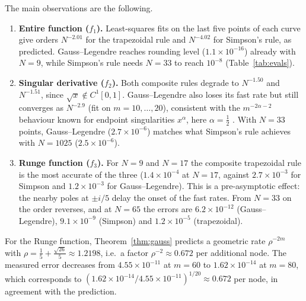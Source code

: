 \documentclass[10pt,twocolumn,a4paper]{article}
\theoremstyle{plain}
\theoremstyle{remark}
\begin{document}
\begin{table}[t]
  \centering
  \small
  \setlength{\tabcolsep}{4pt}
  \caption{Smallest number of evaluations $N$ giving an absolute error below $10^{-8}$ (searched on the grids of Section~\ref{sec:setup}; ``$>$'' means not reached).}
  \label{tab:evals}
  
\end{table}

The main observations are the following.
\begin{enumerate}
  \item \textbf{Entire function ($f_1$).} Least-squares fits on the last five points of each curve give orders $N^{-2.01}$ for the trapezoidal rule and $N^{-4.02}$ for Simpson's rule, as predicted. Gauss--Legendre reaches rounding level ($1.1\times10^{-16}$) already with $N=9$, while Simpson's rule needs $N=33$ to reach $10^{-8}$ (Table~\ref{tab:evals}).
  \item \textbf{Singular derivative ($f_2$).} Both composite rules degrade to $N^{-1.50}$ and $N^{-1.51}$, since $\sqrt{x}\notin C^1[0,1]$. Gauss--Legendre also loses its fast rate but still converges as $N^{-2.9}$ (fit on $m=10,\dots,20$), consistent with the $m^{-2\alpha-2}$ behaviour known for endpoint singularities $x^{\alpha}$, here $\alpha=\tfrac12$ \citep{davis1984}. With $N=33$ points, Gauss--Legendre ($2.7\times10^{-6}$) matches what Simpson's rule achieves with $N=1025$ ($2.5\times10^{-6}$).
  \item \textbf{Runge function ($f_3$).} For $N=9$ and $N=17$ the composite trapezoidal rule is the most accurate of the three ($1.4\times10^{-4}$ at $N=17$, against $2.7\times10^{-3}$ for Simpson and $1.2\times10^{-3}$ for Gauss--Legendre). This is a pre-asymptotic effect: the nearby poles at $\pm i/5$ delay the onset of the fast rates. From $N=33$ on the order reverses, and at $N=65$ the errors are $6.2\times10^{-12}$ (Gauss--Legendre), $9.1\times10^{-9}$ (Simpson) and $1.2\times10^{-5}$ (trapezoidal).
\end{enumerate}

For the Runge function, Theorem~\ref{thm:gauss} predicts a geometric rate $\rho^{-2m}$ with $\rho=\tfrac15+\tfrac{\sqrt{26}}{5}\approx 1.2198$, i.e.\ a factor $\rho^{-2}\approx 0.672$ per additional node. The measured error decreases from $4.55\times10^{-11}$ at $m=60$ to $1.62\times10^{-14}$ at $m=80$, which corresponds to $(1.62\times10^{-14}/4.55\times10^{-11})^{1/20}\approx 0.672$ per node, in agreement with the prediction.
\end{document}
